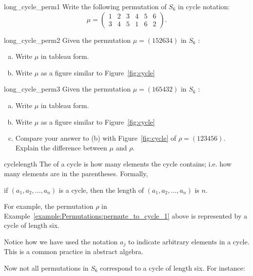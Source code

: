 \begin{exercise}{long_cycle_perm1}
Write the following permutation of $S_6$ in cycle notation:  
\[ \mu = \begin{pmatrix} 1 & 2 & 3 & 4 & 5 & 6 \\ 3 & 4 & 5 & 1 & 6 & 2 \end{pmatrix}. \]
\end{exercise}

\begin{exercise}{long_cycle_perm2}
Given the permutation $\mu = (152634)$ in $S_6$ :
\begin{enumerate}[(a)]
\item
Write $\mu$ in tableau form.
\item
Write $\mu$ as a figure similar to Figure~\ref{fig:cycle}
\end{enumerate}
\end{exercise}

\begin{exercise}{long_cycle_perm3}
Given the permutation $\mu = (165432)$ in $S_6$ :
\begin{enumerate}[(a)]
\item
Write $\mu$ in tableau form.
\item
Write $\mu$ as a figure similar to Figure~\ref{fig:cycle}
\item
Compare your answer to (b) with Figure~\ref{fig:cycle} of $\rho = (123456)$.  Explain the difference between $\mu$ and $\rho$. 
\end{enumerate}
\end{exercise}

\begin{defn}{cyclelength}
The  of a cycle is how many elements the cycle contains; i.e. how many elements are in the parentheses.  Formally, 
\begin{center}
if $(a_1, a_2, \ldots, a_n)$ is a cycle, then the length of $(a_1, a_2, \ldots, a_n)$ is $n$.
\end{center}
\end{defn}
For example, the permutation $\rho$ in Example~\ref{example:Permutations:permute_to_cycle_1} above is represented by a cycle of length six.

\begin{rem}
Notice how we have used the notation $a_j$ to indicate arbitrary elements in a cycle.  This is a common practice in abstract algebra.
\end{rem}

Now not all permutations in $S_6$ correspond to a cycle of length six.  For instance:


